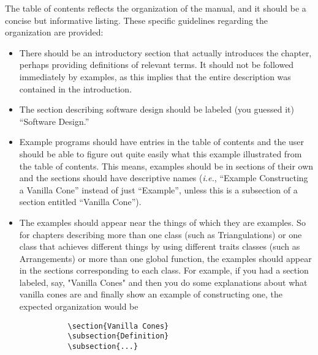 The table of contents reflects the organization of the manual, and it
should be a concise but informative listing. These specific guidelines
regarding the organization are provided:
\begin{itemize}
   \item There should be an introductory section that actually introduces
         the chapter, perhaps providing definitions of relevant terms.
         It should not be followed immediately by examples, as this implies
         that the entire description was contained in the introduction.

   \item The section describing software design should be labeled (you guessed
         it) ``Software Design.''

   \item Example programs should have entries in the table of contents and
         the user should be able to figure out quite easily what this example
         illustrated from the table of contents.  This means, examples should
         be in sections of their own and the sections should have descriptive
         names (\textit{i.e.}, ``Example Constructing a Vanilla Cone'' instead
         of just ``Example'', unless this is a subsection of a section
         entitled ``Vanilla Cone'').

   \item The examples should appear near the things of which they are
         examples.  So for chapters describing more than one class (such as
         Triangulations) or one class that achieves different things by using
         different traits classes (such as Arrangements) or more than one
         global function, the examples should appear in the sections
         corresponding to each class.  For example, if you had a
         section labeled, say, "Vanilla Cones" and then you do some
         explanations about what vanilla cones are and finally show an example
         of constructing one, the expected organization would be
         \begin{verbatim}
           \section{Vanilla Cones}
           \subsection{Definition}
           \subsection{...}

\end{verbatim}
\end{itemize}
